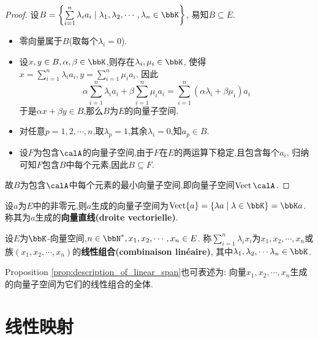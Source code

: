 \begin{proof}
    设$B = \left\{ \sum\limits_{i = 1}^n \lambda_i a_i \mid \lambda_1, \lambda_2, \cdots, \lambda_n \in \bbK \right\}$,
    易知$B \subseteq E$.

    \begin{itemize}
        \item 零向量属于$B$(取每个$\lambda_i = 0$).
        \item 设$x, y \in B, \alpha, \beta \in \bbK$,则存在$\lambda_i, \mu_i \in \bbK$,
            使得$x = \sum\limits_{i = 1}^n \lambda_i a_i, y = \sum\limits_{i = 1}^n \mu_i a_i$.
            因此\[ \alpha \sum\limits_{i = 1}^n \lambda_i a_i + \beta \sum\limits_{i = 1}^n \mu_i a_i =
            \sum\limits_{i = 1}^n (\alpha \lambda_i + \beta \mu_i) a_i \]
            于是$\alpha x + \beta y \in B$,那么$B$为$E$的向量子空间.
        \item 对任意$p = 1, 2, \cdots, n$,取$\lambda_p = 1$,其余$\lambda_i = 0$,知$a_p \in B$.
        \item 设$F$为包含$\calA$的向量子空间,由于$F$在$E$的两运算下稳定,且包含每个$a_i$,
            归纳可知$F$包含$B$中每个元素,因此$B \subseteq F$.
    \end{itemize}

    故$B$为包含$\calA$中每个元素的最小向量子空间,即向量子空间$\vect \calA$.
\end{proof}

\begin{rqq}
    设$a$为$E$中的非零元,则$a$生成的向量子空间为$\vect \{ a \} = \{ \lambda a \mid \lambda \in \bbK \} = \bbK a$.
    称其为$a$生成的\textbf{向量直线(droite vectorielle)}.
\end{rqq}

\begin{deff}
    设$E$为$\bbK$-向量空间,$n \in \bbN^*, x_1, x_2, \cdots, x_n \in E$.
    称$\sum\limits_{i = 1}^n \lambda_i x_i$为$x_1, x_2, \cdots, x_n$或
    族$(x_1, x_2, \cdots, x_n)$的\textbf{线性组合(combinaison linéaire)},
    其中$\lambda_1, \lambda_2, \cdots \lambda_n \in \bbK$.
\end{deff}

\begin{rqq}
    Proposition \ref{prop:description_of_linear_span}也可表述为:
    向量$x_1, x_2, \cdots, x_n$生成的向量子空间为它们的线性组合的全体.
\end{rqq}

\section{线性映射}

